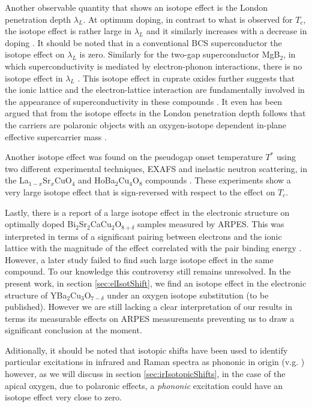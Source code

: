 Another observable quantity that shows an isotope effect is the London penetration depth $\lambda_L$.
At optimum doping, in contrast to what is observed for $T_c$, the isotope effect is rather large in $\lambda_L$ and it similarly increases with a decrease in doping \cite{Zhao1997,Hofer2000,Khasanov2004}.
It should be noted that in a conventional BCS superconductor the isotope effect on $\lambda_L$ is zero.
Similarly for the two-gap superconductor MgB$_2$, in which superconductivity is mediated by electron-phonon interactions, there is no isotope effect in $\lambda_L$ \cite{Castro2004}.
This isotope effect in cuprate oxides further suggests that the ionic lattice and the electron-lattice interaction are fundamentally involved in the appearance of superconductivity in these compounds \cite{Kresin2009}.
It even has been argued that from the isotope effects in the London penetration depth follows that the carriers are polaronic objects with an oxygen-isotope dependent in-plane effective supercarrier mass \cite{Zhao1997,Hofer2000,Khasanov2004}.

Another isotope effect was found on the pseudogap onset temperature $T^*$ using two different experimental techniques, EXAFS and inelastic neutron scattering, in the La$_{1-x}$Sr$_x$CuO$_4$ and HoBa$_2$Cu$_4$O$_8$ compounds \cite{Lanzara1999,RubioTemprano2000}.
These experiments show a very large isotope effect that is sign-reversed with respect to the effect on $T_c$.

Lastly, there is a report of a large isotope effect in the electronic structure on optimally doped Bi$_2$Sr$_2$CaCu$_2$O$_{8+\delta}$ samples measured by ARPES. 
This was interpreted in terms of a significant pairing between electrons and the ionic lattice with the magnitude of the effect correlated with the pair binding energy \cite{Gweon2004}.
However, a later study failed to find such large isotope effect \cite{Douglas2007} in the same compound.
To our knowledge this controversy still remains unresolved.
In the present work, in section \ref{sec:elIsotShift}, we find an isotope effect in the electronic structure of YBa$_2$Cu$_3$O$_{7-\delta}$ under an oxygen isotope substitution (to be published).
However we are still lacking a clear interpretation of our results in terms its measurable effects on ARPES measurements preventing us to draw a significant conclusion at the moment.

Aditionally, it should be noted that isotopic shifts have been used to identify particular excitations in infrared and Raman spectra as phononic in origin (v.g. \cite{Thomsen1990}) however, as we will discuss in section \ref{sec:irIsotopicShifts}, in the case of the apical oxygen, due to polaronic effects, a \textit{phononic} excitation could have an isotope effect very close to zero.
